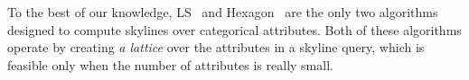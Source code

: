 To the best of our knowledge, LS~\cite{morse2007efficient} and Hexagon~\cite{preisinger2007hexagon} are the only two algorithms designed to compute skylines over categorical attributes. Both of these algorithms operate by creating {\em a lattice} over the attributes in a skyline query, which is feasible only when the number of attributes is really small. 


